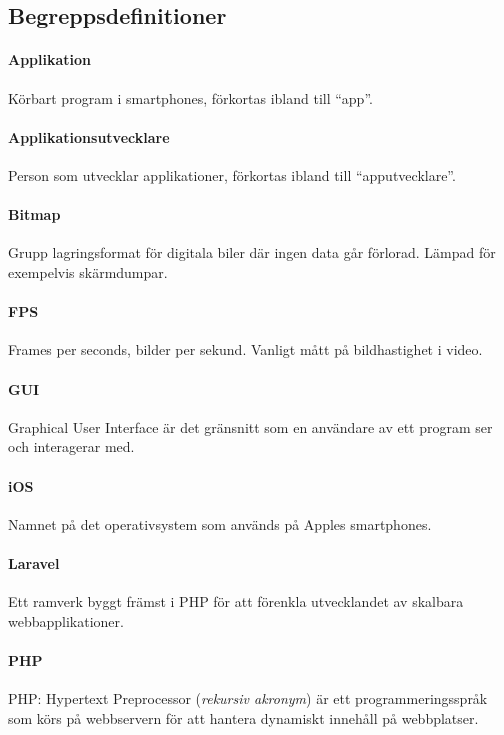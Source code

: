 \subsection{Begreppsdefinitioner}

\paragraph{Applikation} Körbart program i smartphones, förkortas ibland till ``app''.

\paragraph{Applikationsutvecklare} Person som utvecklar applikationer, förkortas  ibland till ``apputvecklare''.

\paragraph{Bitmap} Grupp lagringsformat för digitala biler där ingen data går förlorad. Lämpad för exempelvis skärmdumpar.

\paragraph{FPS} Frames per seconds, bilder per sekund. Vanligt mått på bildhastighet i video.

\paragraph{GUI} Graphical User Interface är det gränsnitt som en användare av ett program ser och interagerar med.

\paragraph{iOS} Namnet på det operativsystem som används på Apples smartphones.

\paragraph{Laravel} Ett ramverk byggt främst i PHP för att förenkla utvecklandet av skalbara webbapplikationer\parencite{laravel}.

\paragraph{PHP} PHP: Hypertext Preprocessor (\textit{rekursiv akronym}) är ett programmeringsspråk som körs på webbservern för att hantera dynamiskt innehåll på webbplatser.


